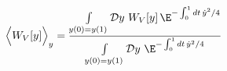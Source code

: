 \begin{equation}
\Big\langle W_V[y]\Big\rangle_y = \frac{
\int\limits_{y(0)=y(1)} {\cal D}y\,\, W_V[y] \,\E^{-\int_0^1 dt\,
  \dot{y}^2/4}}
{\int\limits_{y(0)=y(1)} {\cal D}y\, \,\E^{-\int_0^1 dt\,
  \dot{y}^2/4}} \label{1.4}
\end{equation}


